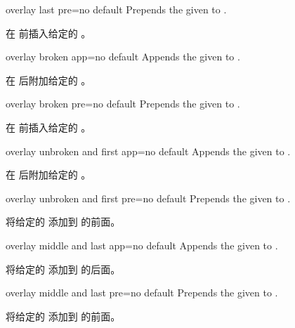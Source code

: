 \begin{docTcbKey}{overlay last pre}{=}{no default}
Prepends the given  to .

在  前插入给定的 。
\end{docTcbKey}

\begin{docTcbKey}{overlay broken app}{=}{no default}
Appends the given  to .

在  后附加给定的 。
\end{docTcbKey}

\begin{docTcbKey}{overlay broken pre}{=}{no default}
Prepends the given  to .

在  前插入给定的 。
\end{docTcbKey}

\begin{docTcbKey}{overlay unbroken and first app}{=}{no default}
Appends the given  to .

在  后附加给定的 。
\end{docTcbKey}

\begin{docTcbKey}{overlay unbroken and first pre}{=}{no default}
Prepends the given  to .

将给定的  添加到  的前面。
\end{docTcbKey}

\begin{docTcbKey}{overlay middle and last app}{=}{no default}
Appends the given  to .

将给定的  添加到  的后面。
\end{docTcbKey}

\begin{docTcbKey}{overlay middle and last pre}{=}{no default}
Prepends the given  to .

将给定的  添加到  的前面。
\end{docTcbKey}

